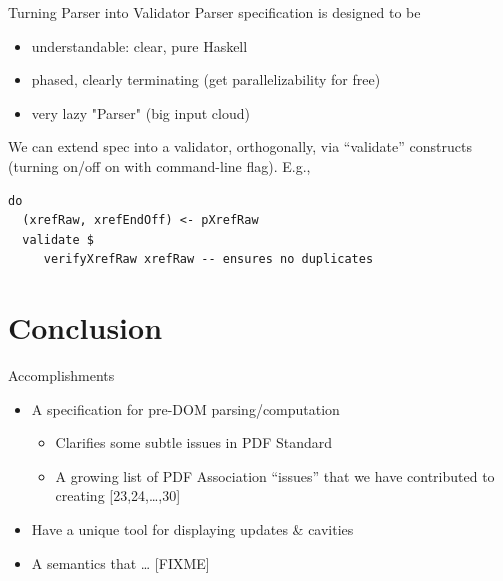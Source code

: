 \documentclass[t,10pt,xcolor={dvipsnames}]{beamer}
\begin{document}
\begin{frame}[label={sec:org9b54fc5},fragile]{Turning Parser into Validator}
 Parser specification is designed to be
\begin{itemize}
\item understandable: clear, pure Haskell
\item phased, clearly terminating (get parallelizability for free)
\item very lazy "Parser" (big input cloud)
\end{itemize}

We can extend spec into a validator, orthogonally, via “validate” constructs
(turning on/off on with command-line flag).  E.g.,
\lstset{language=haskell,label= ,caption= ,captionpos=b,numbers=none}
\begin{lstlisting}
do
  (xrefRaw, xrefEndOff) <- pXrefRaw
  validate $
     verifyXrefRaw xrefRaw -- ensures no duplicates
\end{lstlisting}
\end{frame}

\section{Conclusion}
\label{sec:orgc84a54b}
\begin{frame}[label={sec:org9238346}]{Accomplishments}
\begin{itemize}
\item A specification for pre-DOM parsing/computation
\begin{itemize}
\item Clarifies some subtle issues in PDF Standard
\item A growing list of PDF Association “issues” that we have contributed to
creating [23,24,\ldots{},30]
\end{itemize}
\item Have a unique tool for displaying updates \& cavities
\item A semantics that \ldots{} [FIXME]
\end{itemize}
\end{frame}
\end{document}
